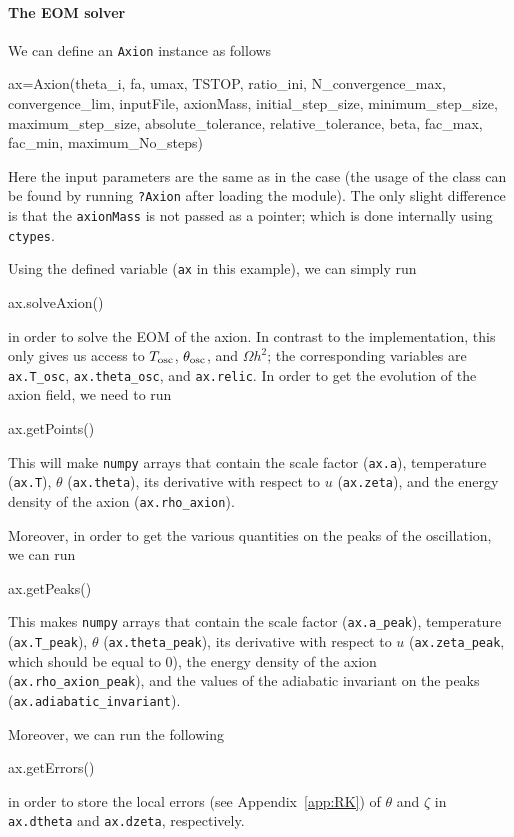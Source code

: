 \documentclass[11pt,a4paper]{article}
\begin{document}
\paragraph{The EOM solver}
%
We can define an {\tt Axion} instance as follows 
%
\begin{py}
	ax=Axion(theta_i, fa, umax, TSTOP, ratio_ini, N_convergence_max, convergence_lim, 
	inputFile, axionMass, initial_step_size, minimum_step_size, maximum_step_size, 
	absolute_tolerance, relative_tolerance, beta, fac_max, fac_min, maximum_No_steps)
\end{py}
%
Here the input parameters are the same as in the \CPP case (the usage of the class can be found by running {\tt ?Axion} after loading the module). The only slight difference is that the {\tt axionMass} is not passed as a pointer; which is done internally using {\tt ctypes}. 


Using the defined variable ({\tt ax} in this example), we can simply run  
%
\begin{py}
	ax.solveAxion()
\end{py}
%
in order to solve the EOM of the axion. In contrast to the \CPP implementation, this only gives us access to $T_{\rm osc}{}$, $\theta_{\rm osc}{}$, and $\Omega h^2$; the corresponding variables are {\tt ax.T\_osc}, {\tt ax.theta\_osc}, and {\tt ax.relic}. In order to get the evolution of the axion field, we need to run 
%
\begin{py}
	ax.getPoints()
\end{py}
%
This will make {\tt numpy} arrays that contain the scale factor ({\tt ax.a}), temperature ({\tt ax.T}), $\theta$ ({\tt ax.theta}), its derivative with respect to $u$ ({\tt ax.zeta}), and the energy density of the axion ({\tt ax.rho\_axion}).

Moreover, in order to get the various quantities on the peaks of the oscillation, we can run
%
\begin{py}
	ax.getPeaks()
\end{py}
%
This makes {\tt numpy} arrays that contain the scale factor ({\tt ax.a\_peak}), temperature ({\tt ax.T\_peak}), $\theta$ ({\tt ax.theta\_peak}), its derivative with respect to $u$ ({\tt ax.zeta\_peak}, which should be equal to $0$), the energy density of the axion ({\tt ax.rho\_axion\_peak}), and the values of the adiabatic invariant on the peaks ({\tt ax.adiabatic\_invariant}).

Moreover, we can run the following
%
\begin{py}
	ax.getErrors()
\end{py}
%
in order to store the local errors (see Appendix~\ref{app:RK}) of $\theta$ and $\zeta$ in {\tt ax.dtheta} and {\tt ax.dzeta}, respectively. 
\end{document}
